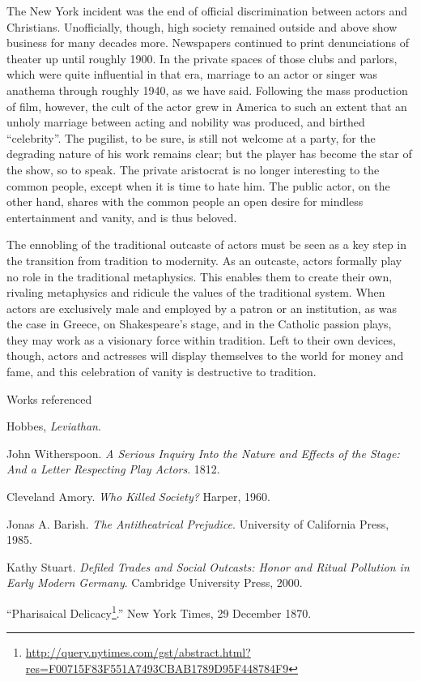 The New York incident was the end of official discrimination between actors and Christians. Unofficially, though, high society remained outside and above show business for many decades more. Newspapers continued to print denunciations of theater up until roughly 1900. In the private spaces of those clubs and parlors, which were quite influential in that era, marriage to an actor or singer was anathema through roughly 1940, as we have said. Following the mass production of film, however, the cult of the actor grew in America to such an extent that an unholy marriage between acting and nobility was produced, and birthed ``celebrity''. The pugilist, to be sure, is still not welcome at a party, for the degrading nature of his work remains clear; but the player has become the star of the show, so to speak. The private aristocrat is no longer interesting to the common people, except when it is time to hate him. The public actor, on the other hand, shares with the common people an open desire for mindless entertainment and vanity, and is thus beloved.

The ennobling of the traditional outcaste of actors must be seen as a key step in the transition from tradition to modernity. As an outcaste, actors formally play no role in the traditional metaphysics. This enables them to create their own, rivaling metaphysics and ridicule the values of the traditional system. When actors are exclusively male and employed by a patron or an institution, as was the case in Greece, on Shakespeare's stage, and in the Catholic passion plays, they may work as a visionary force within tradition. Left to their own devices, though, actors and actresses will display themselves to the world for money and fame, and this celebration of vanity is destructive to tradition.

Works referenced

Hobbes, \emph{Leviathan}.

John Witherspoon. \emph{A Serious Inquiry Into the Nature and Effects of the Stage: And a Letter Respecting Play Actors}. 1812.

Cleveland Amory. \emph{Who Killed Society?} Harper, 1960.

Jonas A. Barish. \emph{The Antitheatrical Prejudice}. University of California Press, 1985.

Kathy Stuart. \emph{Defiled Trades and Social Outcasts: Honor and Ritual Pollution in Early Modern Germany}. Cambridge University Press, 2000.

``Pharisaical Delicacy\footnote{\url{http://query.nytimes.com/gst/abstract.html?res=F00715F83F551A7493CBAB1789D95F448784F9}}.'' New York Times, 29 December 1870.

